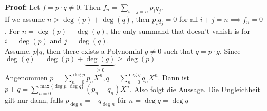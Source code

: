 \textbf{Proof:} \quad Let $f = p \cdot q \neq 0$. Then $f_n = \sum_{i+j=n} p_iq_j$.\\
If we assume $n > \deg(p) + \deg(q)$, then $p_iq_j = 0$ for all $i+j = n \implies f_n = 0$. For $n = \deg(p) + \deg(q)$, the only summand that doesn't vanish is for $i = \deg(p)$ and $j = \deg(q)$.\\
Assume, $p | q$, then there exists a Polynomial $g \neq 0$ such that $q = p \cdot g$. Since $\deg(q) = \deg(p) + \underbrace{\deg(g)}_{\geq 0} \geq \deg(p)$\\
Angenommen $p = \sum_{n = 0}^{\deg p}p_nX^n, q = \sum_{n = 0}^{\deg q}q_n X^n$. Dann ist $p + q = \sum_{n = 0}^{\max\{\deg p,\deg q\}}(p_n + q_n)X^n$. Also folgt die Aussage. Die Ungleichheit gilt nur dann, falls $p_{\deg n} = - q_{\deg n}$ für $n = \deg q = \deg q$\\


